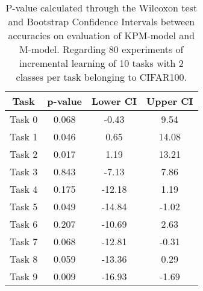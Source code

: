 \begin{table}[H]
\centering
\begin{tabular}{cccc}
\toprule
Task & p-value & Lower CI & Upper CI \\
\midrule
Task 0 & 0.068 &-0.43 & 9.54 \\
Task 1 & 0.046 &0.65 & 14.08 \\
Task 2 & 0.017 &1.19 & 13.21 \\
Task 3 & 0.843 &-7.13 & 7.86 \\
Task 4 & 0.175 &-12.18 & 1.19 \\
Task 5 & 0.049 &-14.84 & -1.02 \\
Task 6 & 0.207 &-10.69 & 2.63 \\
Task 7 & 0.068 &-12.81 & -0.31 \\
Task 8 & 0.059 &-13.36 & 0.29 \\
Task 9 & 0.009 &-16.93 & -1.69 \\
\bottomrule
\end{tabular}
\caption{P-value calculated through the Wilcoxon test and Bootstrap Confidence Intervals between accuracies on evaluation of KPM-model and M-model. Regarding 80 experiments of incremental learning of 10 tasks with 2 classes per task belonging to CIFAR100.}
\end{table}
